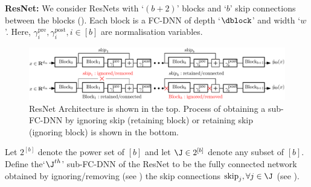 \textbf{ResNet:} We consider ResNets with `$(b+2)$' blocks and `$b$' skip connections between the blocks (). Each block is a FC-DNN of depth `$\dblock$' and width `$w$'. Here, $\gamma^{\text{pre}}_i,\gamma^{\text{post}}_i,i\in[b]$ are normalisation variables. 
\begin{figure}
\centering
\includegraphics[scale=0.04]{figs/resnet-full.png}
\caption{\small{ResNet Architecture is shown in the top. Process of obtaining a sub-FC-DNN by ignoring skip (retaining block) or retaining skip (ignoring block) is shown in the bottom.}}
\label{fig:resnet}
\end{figure}
\begin{definition}
Let $2^{[b]}$ denote the power set of $[b]$ and let $\J\in 2^{[b]}$ denote any subset of $[b]$. Define the`$\J^{th}$' sub-FC-DNN of the ResNet to be the fully connected network obtained by ignoring/removing (see ) the skip connections $\text{skip}_j,\forall j\in \J$ (see ).
\end{definition}

